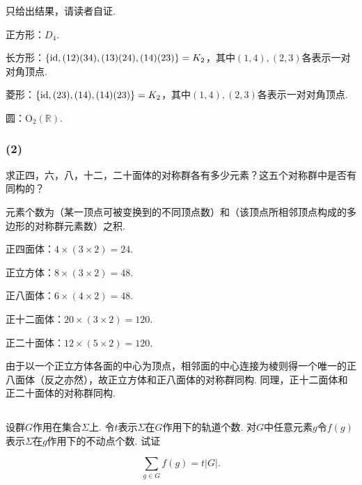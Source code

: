 \jie 只给出结果，请读者自证.

正方形：$D_4$.

长方形：$\{\operatorname{id}, (12)(34),(13)(24),(14)(23)\}=K_2$，其中$(1,4),(2,3)$各表示一对对角顶点.

菱形：$\{\operatorname{id}, (23), (14), (14)(23)\}=K_2$，其中$(1,4),(2,3)$各表示一对对角顶点.

圆：$\mathrm{O}_2(\mathbb{R})$.

\subsubsection{(2)}
求正四，六，八，十二，二十面体的对称群各有多少元素？这五个对称群中是否有同构的？

\jie 元素个数为（某一顶点可被变换到的不同顶点数）和（该顶点所相邻顶点构成的多边形的对称群元素数）之积.

正四面体：$4\times(3\times2)=24$.

正立方体：$8\times(3\times2)=48$.

正八面体：$6\times(4\times2)=48$.

正十二面体：$20\times(3\times2)=120$.

正二十面体：$12\times(5\times2)=120$.

由于以一个正立方体各面的中心为顶点，相邻面的中心连接为棱则得一个唯一的正八面体（反之亦然），故正立方体和正八面体的对称群同构. 同理，正十二面体和正二十面体的对称群同构.

\subsection{}
设群$G$作用在集合$\Sigma$上. 令$t$表示$\Sigma$在$G$作用下的轨道个数. 对$G$中任意元素$g$令$f(g)$表示$\Sigma$在$g$作用下的不动点个数. 试证

$$\sum_{g\in G}f(g)=t|G|.$$


